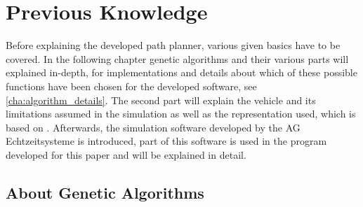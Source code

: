 \chapter{Previous Knowledge}
\label{cha:previous_knowledge}

Before explaining the developed path planner, various given basics have to be covered. In the following chapter genetic algorithms and their various parts will explained in-depth, for implementations and details about which of these possible functions have been chosen for the developed software, see \ref{cha:algorithm_details}. The second part will explain the vehicle and its limitations assumed in the simulation as well as the representation used, which is based on \cite{12}. Afterwards, the simulation software developed by the AG Echtzeitsysteme is introduced, part of this software is used in the program developed for this paper and will be explained in detail.

\section{About Genetic Algorithms}
\label{sec:previous_knowledge_ga}

